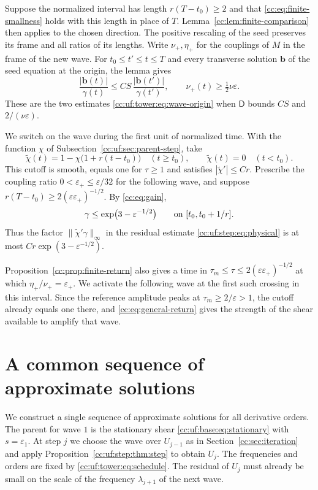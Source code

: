 Suppose the normalized interval has length $r(T-t_0)\ge2$ and that
\eqref{cc:eq:finite-smallness} holds with this length in place of $T$.
Lemma~\ref{cc:lem:finite-comparison} then applies to the chosen
direction. The positive rescaling of the seed preserves its frame and
all ratios of its lengths. Write $\nu_+,\eta_+$ for the couplings of
$M$ in the frame of the new wave. For $t_0\le t'\le t\le T$ and every
transverse solution $\mathbf b$ of the seed equation at the origin,
the lemma gives
\begin{equation}\label{cc:uf:tower:eq:later-origin}
 \frac{|\mathbf b(t)|}{\gamma(t)}
 \le CS\,\frac{|\mathbf b(t')|}{\gamma(t')},\qquad
 \nu_+(t)\ge\tfrac12\nu\varepsilon.
\end{equation}
These are the two estimates \eqref{cc:uf:tower:eq:wave-origin} when
$\mathsf D$ bounds $CS$ and $2/(\nu\varepsilon)$.

We switch on the wave during the first unit of normalized time. With
the function $\chi$ of Subsection~\ref{cc:uf:sec:parent-step}, take
\[
 \widetilde\chi(t)=1-\chi\bigl(1+r(t-t_0)\bigr)\quad(t\ge t_0),\qquad
 \widetilde\chi(t)=0\quad(t<t_0).
\]
This cutoff is smooth, equals one for $\tau\ge1$ and satisfies
$|\widetilde\chi'|\le Cr$. Prescribe the coupling ratio
$0<\varepsilon_+\le\varepsilon/32$ for the following wave, and suppose
$r(T-t_0)\ge2(\varepsilon\varepsilon_+)^{-1/2}$. By \eqref{cc:eq:gain},
\begin{equation}\label{cc:uf:tower:eq:switch-small}
 \gamma\le\exp\bigl(3-\varepsilon^{-1/2}\bigr)
 \qquad\hbox{on }[t_0,t_0+1/r].
\end{equation}
Thus the factor $\|\widetilde\chi'\gamma\|_\infty$ in the residual
estimate \eqref{cc:uf:step:eq:physical} is at most
$Cr\exp(3-\varepsilon^{-1/2})$.

Proposition~\ref{cc:prop:finite-return} also gives a time in
$\tau_m\le\tau\le2(\varepsilon\varepsilon_+)^{-1/2}$ at which
$\eta_+/\nu_+=\varepsilon_+$. We activate the following wave at the
first such crossing in this interval. Since the reference amplitude
peaks at $\tau_m\ge2/\varepsilon>1$, the cutoff already equals one
there, and \eqref{cc:eq:general-return} gives the strength of the
shear available to amplify that wave.

\section{A common sequence of approximate solutions}\label{cc:uf:sec:tower}

We construct a single sequence of approximate solutions for all
derivative orders. The parent for wave $1$ is the stationary shear
\eqref{cc:uf:base:eq:stationary} with $s=\varepsilon_1$. At step $j$
we choose the wave over $U_{j-1}$ as in Section~\ref{cc:sec:iteration}
and apply Proposition~\ref{cc:uf:step:thm:step} to obtain $U_j$.
The frequencies and orders are fixed by \eqref{cc:uf:tower:eq:schedule}.
The residual of $U_j$ must already be small on the scale of the
frequency $\lambda_{j+1}$ of the next wave.

